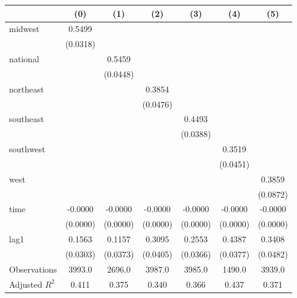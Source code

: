 \begin{tabular}{lcccccc}
\toprule
 & (0) & (1) & (2) & (3) & (4) & (5) \\
\midrule
midwest & 0.5499 &  &  &  &  &  \\
\vspace{0.2cm}
 & (0.0318) &  &  &  &  &  \\
national &  & 0.5459 &  &  &  &  \\
\vspace{0.2cm}
 &  & (0.0448) &  &  &  &  \\
northeast &  &  & 0.3854 &  &  &  \\
\vspace{0.2cm}
 &  &  & (0.0476) &  &  &  \\
southeast &  &  &  & 0.4493 &  &  \\
\vspace{0.2cm}
 &  &  &  & (0.0388) &  &  \\
southwest &  &  &  &  & 0.3519 &  \\
\vspace{0.2cm}
 &  &  &  &  & (0.0451) &  \\
west &  &  &  &  &  & 0.3859 \\
\vspace{0.2cm}
 &  &  &  &  &  & (0.0872) \\
time & -0.0000 & -0.0000 & -0.0000 & -0.0000 & -0.0000 & -0.0000 \\
\vspace{0.2cm}
 & (0.0000) & (0.0000) & (0.0000) & (0.0000) & (0.0000) & (0.0000) \\
lag1 & 0.1563 & 0.1157 & 0.3095 & 0.2553 & 0.4387 & 0.3408 \\
\vspace{0.2cm}
 & (0.0303) & (0.0373) & (0.0405) & (0.0366) & (0.0377) & (0.0482) \\
\midrule
Observations & 3993.0 & 2696.0 & 3987.0 & 3985.0 & 1490.0 & 3939.0 \\
Adjusted $R^2$ & 0.411 & 0.375 & 0.340 & 0.366 & 0.437 & 0.371 \\
\bottomrule
\end{tabular}